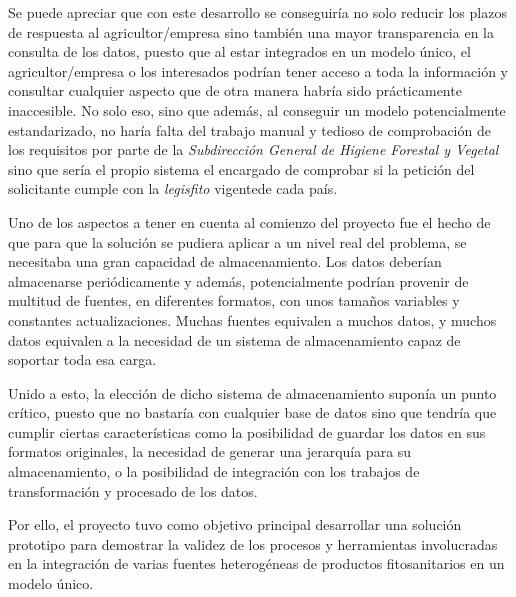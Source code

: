 Se puede apreciar que con este desarrollo se conseguiría no solo reducir los plazos de respuesta al agricultor/empresa sino también una mayor transparencia en la consulta de los datos, puesto que al estar integrados en un modelo único, el agricultor/empresa o los interesados podrían tener acceso a toda la información y consultar cualquier aspecto que de otra manera habría sido prácticamente inaccesible. No solo eso, sino que además, al conseguir un modelo potencialmente estandarizado, no haría falta del trabajo manual y tedioso de comprobación de los requisitos por parte de la \textit{Subdirección General de Higiene Forestal y Vegetal} sino que sería el propio sistema el encargado de comprobar si la petición del solicitante cumple con la \textit{\gls{legisfito}} vigentede cada país. \par
Uno de los aspectos a tener en cuenta al comienzo del proyecto fue el hecho de que para que la solución se pudiera aplicar a un nivel real del problema, se necesitaba una gran capacidad de almacenamiento. Los datos deberían almacenarse periódicamente y además, potencialmente podrían provenir de multitud de fuentes, en diferentes formatos, con unos tamaños variables y constantes actualizaciones. Muchas fuentes equivalen a muchos datos, y muchos datos equivalen a la necesidad de un sistema de almacenamiento capaz de soportar toda esa carga. 
\par
Unido a esto, la elección de dicho sistema de almacenamiento suponía un punto crítico, puesto que no bastaría con cualquier base de datos sino que tendría que cumplir ciertas características como la posibilidad de guardar los datos en sus formatos originales, la necesidad de generar una jerarquía para su almacenamiento, o la posibilidad de integración con los trabajos de transformación y procesado de los datos. 
\par
Por ello, el proyecto tuvo como objetivo principal desarrollar una solución prototipo para demostrar la validez de los procesos y herramientas involucradas en la integración de varias fuentes heterogéneas de productos fitosanitarios en un modelo único.

